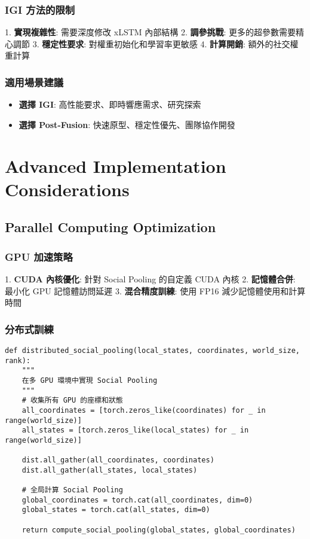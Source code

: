 \documentclass[11pt,a4paper]{article}
\begin{document}
\subsubsection{IGI 方法的限制}
1. \textbf{實現複雜性}: 需要深度修改 xLSTM 內部結構
2. \textbf{調參挑戰}: 更多的超參數需要精心調節
3. \textbf{穩定性要求}: 對權重初始化和學習率更敏感
4. \textbf{計算開銷}: 額外的社交權重計算

\subsubsection{適用場景建議}
\begin{itemize}
\item \textbf{選擇 IGI}: 高性能要求、即時響應需求、研究探索
\item \textbf{選擇 Post-Fusion}: 快速原型、穩定性優先、團隊協作開發
\end{itemize}

\section{Advanced Implementation Considerations}

\subsection{Parallel Computing Optimization}

\subsubsection{GPU 加速策略}
1. \textbf{CUDA 內核優化}: 針對 Social Pooling 的自定義 CUDA 內核
2. \textbf{記憶體合併}: 最小化 GPU 記憶體訪問延遲
3. \textbf{混合精度訓練}: 使用 FP16 減少記憶體使用和計算時間

\subsubsection{分布式訓練}

\begin{lstlisting}[style=pythonstyle, caption={分布式 Social Pooling 實現}]
def distributed_social_pooling(local_states, coordinates, world_size, rank):
    """
    在多 GPU 環境中實現 Social Pooling
    """
    # 收集所有 GPU 的座標和狀態
    all_coordinates = [torch.zeros_like(coordinates) for _ in range(world_size)]
    all_states = [torch.zeros_like(local_states) for _ in range(world_size)]
    
    dist.all_gather(all_coordinates, coordinates)
    dist.all_gather(all_states, local_states)
    
    # 全局計算 Social Pooling
    global_coordinates = torch.cat(all_coordinates, dim=0)
    global_states = torch.cat(all_states, dim=0)
    
    return compute_social_pooling(global_states, global_coordinates)
\end{lstlisting}
\end{document}
